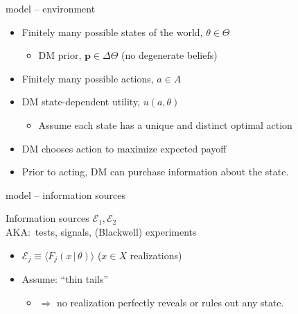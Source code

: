\documentclass[square,]{gBakerBeamer}
\renewcommand{\|}{\,|\,}
\begin{document}
\begin{frame}{model -- environment}

  \begin{itemize}
    \item \alert<1>{Finitely many possible states of the world, $\theta \in \Theta$}
          \begin{itemize}
            \item DM prior, $\mathbf{p}\in\Delta\Theta$ (no degenerate beliefs)
          \end{itemize}
    \item<2-> \alert<2>{Finitely many possible actions, $a\in A$ }
    \item<3-> \alert<3>{DM state-dependent utility, $u(a,\theta)$}
          \begin{itemize}
            \item<3-> Assume each state has a unique and distinct optimal action
          \end{itemize}
    \item<4-> \alert<4>{DM chooses action to maximize expected payoff}\\[2em]
    \item<5-> \alert<5>{Prior to acting, DM can purchase information about the state.}
  \end{itemize}

  \note{%

  }
\end{frame}


\begin{frame}{model -- information sources}

  Information sources $\mathcal{E}_{1}, \mathcal{E}_{2}$\\
  AKA:\ tests, signals, (Blackwell) experiments

  \begin{itemize}
    \item<1-> \alert<1>{$\mathcal{E}_j\equiv \langle F_j(x \| \theta) \rangle$ ($x\in X$ realizations)}
    \item<2-> \alert<2->{Assume: ``thin tails''}
          \begin{itemize}
            \item<3-> $\Rightarrow$ no realization perfectly reveals or rules out any state.
          \end{itemize}
  \end{itemize}

\end{frame}
\end{document}
